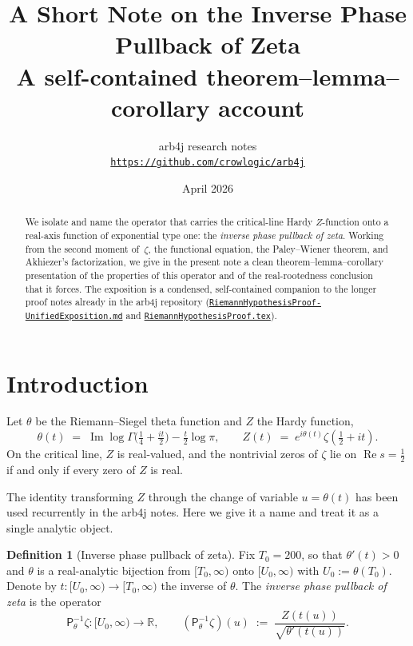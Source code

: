 \documentclass[11pt,a4paper]{article}
\title{A Short Note on the Inverse Phase Pullback of Zeta\\
\large A self-contained theorem--lemma--corollary account}
\author{arb4j research notes\\
\small \texttt{\url{https://github.com/crowlogic/arb4j}}}
\date{April 2026}
\theoremstyle{definition}
\newtheorem{definition}[theorem]{Definition}
\DeclareMathOperator{\Real}{Re}
\DeclareMathOperator{\Imag}{Im}
\newcommand{\ipp}{\mathsf{P}_\theta^{-1}}
\newcommand{\R}{\mathbb{R}}
\begin{document}
\maketitle

\begin{abstract}
We isolate and name the operator that carries the critical-line Hardy $Z$-function
onto a real-axis function of exponential type one: the \emph{inverse phase pullback of
zeta}. Working from the second moment of~$\zeta$, the functional equation, the
Paley--Wiener theorem, and Akhiezer's factorization, we give in the present note a
clean theorem--lemma--corollary presentation of the properties of this operator and
of the real-rootedness conclusion that it forces. The exposition is a condensed,
self-contained companion to the longer proof notes already in the arb4j repository
(\href{https://github.com/crowlogic/arb4j/blob/master/docs/RiemannHypothesisProof-UnifiedExposition.md}{\texttt{RiemannHypothesisProof-UnifiedExposition.md}}
and
\href{https://github.com/crowlogic/arb4j/blob/master/docs/RiemannHypothesisProof.tex}{\texttt{RiemannHypothesisProof.tex}}).
\end{abstract}

\section{Introduction}

Let $\theta$ be the Riemann--Siegel theta function and $Z$ the Hardy function,
\begin{equation}
  \theta(t) \;=\; \Imag\log\Gamma\!\bigl(\tfrac14 + \tfrac{it}{2}\bigr) - \tfrac{t}{2}\log\pi,
  \qquad
  Z(t) \;=\; e^{i\theta(t)}\zeta(\tfrac12+it).
  \label{eq:theta-Z}
\end{equation}
On the critical line, $Z$ is real-valued, and the nontrivial zeros of $\zeta$ lie on
$\Real s = \tfrac12$ if and only if every zero of $Z$ is real.

The identity transforming $Z$ through the change of variable $u = \theta(t)$ has been
used recurrently in the arb4j notes. Here we give it a name and treat it as a single
analytic object.

\begin{definition}[Inverse phase pullback of zeta]
\label{def:IPP}
Fix $T_0 = 200$, so that $\theta'(t) > 0$ and $\theta$ is a real-analytic bijection
from $[T_0,\infty)$ onto $[U_0,\infty)$ with $U_0 := \theta(T_0)$. Denote by
$t \colon [U_0,\infty)\to[T_0,\infty)$ the inverse of $\theta$. The
\emph{inverse phase pullback of zeta} is the operator
\begin{equation}
  \ipp\zeta \colon [U_0,\infty) \longrightarrow \R,
  \qquad
  (\ipp\zeta)(u) \;:=\; \frac{Z(t(u))}{\sqrt{\theta'(t(u))}}.
  \label{eq:IPP}
\end{equation}
\end{definition}
\end{document}
